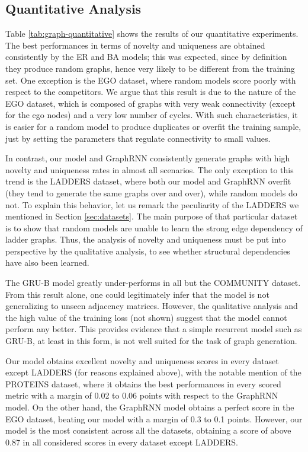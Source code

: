 \subsection{Quantitative Analysis}
Table \ref{tab:graph-quantitative} shows the results of our quantitative experiments. The best performances in terms of novelty and uniqueness are obtained consistently by the ER and BA models; this was expected, since by definition they produce random graphs, hence very likely to be different from the training set. One exception is the EGO dataset, where random models score poorly with respect to the competitors. We argue that this result is due to the nature of the EGO dataset, which is composed of graphs with very weak connectivity (except for the ego nodes) and a very low number of cycles. With such characteristics, it is easier for a random model to produce duplicates or overfit the training sample, just by setting the parameters that regulate connectivity to small values.

In contrast, our model and GraphRNN consistently generate graphs with high novelty and uniqueness rates in almost all scenarios. The only exception to this trend is the LADDERS dataset, where both our model and GraphRNN overfit (they tend to generate the same graphs over and over), while random models do not. To explain this behavior, let us remark the peculiarity of the LADDERS we mentioned in Section \ref{sec:datasets}. The main purpose of that particular dataset is to show that random models are unable to learn the strong edge dependency of ladder graphs. Thus, the analysis of novelty and uniqueness must be put into perspective by the qualitative analysis, to see whether structural dependencies have also been learned.

The GRU-B model greatly under-performs in all but the COMMUNITY dataset. From this result alone, one could legitimately infer that the model is not generalizing to unseen adjacency matrices. However, the qualitative analysis and the high value of the training loss (not shown) suggest that the model cannot perform any better. This provides evidence that a simple recurrent model such as GRU-B, at least in this form, is not well suited for the task of graph generation.

Our model obtains excellent novelty and uniqueness scores in every dataset except LADDERS (for reasons explained above), with the notable mention of the PROTEINS dataset, where it obtains the best performances in every scored metric with a margin of 0.02 to 0.06 points with respect to the GraphRNN model. On the other hand, the GraphRNN model obtains a perfect score in the EGO dataset, beating our model with a margin of 0.3 to 0.1 points. However, our model is the most consistent across all the datasets, obtaining a score of above 0.87 in all considered scores in every dataset except LADDERS.

